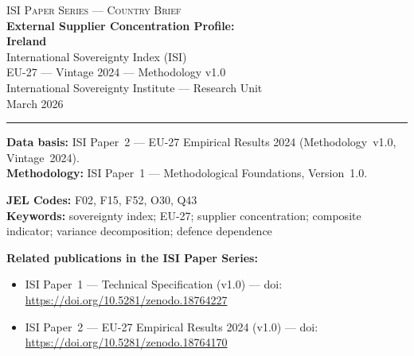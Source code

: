 \documentclass[12pt,a4paper]{article}
\begin{document}
\hypersetup{pageanchor=false}

\begin{titlepage}
\centering
\vspace*{2cm}
{\Large\textsc{ISI Paper Series --- Country Brief}}\\[1.2cm]
{\LARGE\bfseries External Supplier Concentration Profile:\\[0.3em]
Ireland}\\[1.5cm]
{\large International Sovereignty Index (ISI)\\[0.3em]
EU-27 --- Vintage 2024 --- Methodology v1.0}\\[1.2cm]
{\large International Sovereignty Institute --- Research Unit}\\[0.8cm]
{\large March 2026}

\vspace{0.8cm}
\noindent\rule{\textwidth}{0.4pt}
\vspace{0.4cm}

\begin{flushleft}
\noindent\textbf{Data basis:} ISI Paper~2 --- EU-27 Empirical Results 2024 (Methodology~v1.0, Vintage~2024).\\[4pt]
\noindent\textbf{Methodology:} ISI Paper~1 --- Methodological Foundations, Version~1.0.

\medskip

\noindent\textbf{JEL Codes:} F02, F15, F52, O30, Q43\\[4pt]
\noindent\textbf{Keywords:} sovereignty index; EU-27; supplier concentration; composite indicator; variance decomposition; defence dependence

\medskip

\noindent\textbf{Related publications in the ISI Paper Series:}
\begin{itemize}[nosep,leftmargin=1.5em]
\item ISI Paper~1 --- Technical Specification (v1.0) --- doi:\\
  \url{https://doi.org/10.5281/zenodo.18764227}
\item ISI Paper~2 --- EU-27 Empirical Results 2024 (v1.0) --- doi:\\
  \url{https://doi.org/10.5281/zenodo.18764170}
\end{itemize}
\end{flushleft}
\vfill
\end{titlepage}
\end{document}
